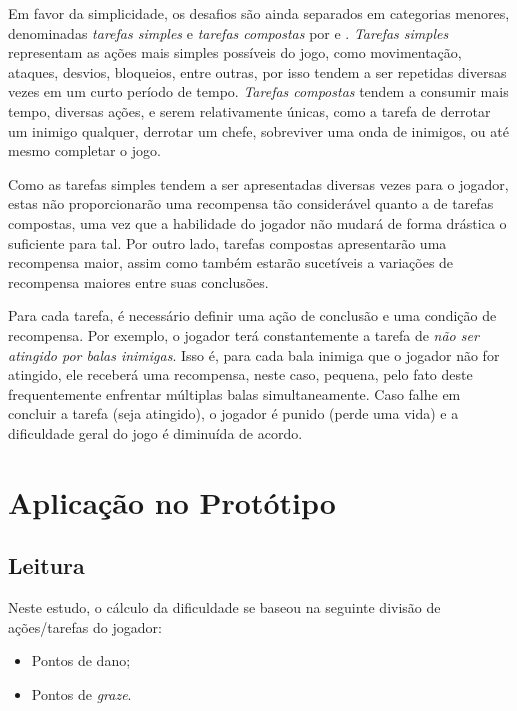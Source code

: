 Em favor da simplicidade, os desafios são ainda separados em categorias menores, denominadas \textit{tarefas simples} e \textit{tarefas compostas} por \citet{ExperimentalValidation} e \citet{FearOfFailing}. \textit{Tarefas simples} representam as ações mais simples possíveis do jogo, como movimentação, ataques, desvios, bloqueios, entre outras, por isso tendem a ser repetidas diversas vezes em um curto período de tempo. \textit{Tarefas compostas} tendem a consumir mais tempo, diversas ações, e serem relativamente únicas, como a tarefa de derrotar um inimigo qualquer, derrotar um chefe, sobreviver uma onda de inimigos, ou até mesmo completar o jogo.

Como as tarefas simples tendem a ser apresentadas diversas vezes para o jogador, estas não proporcionarão uma recompensa tão considerável quanto a de tarefas compostas, uma vez que a habilidade do jogador não mudará de forma drástica o suficiente para tal. Por outro lado, tarefas compostas apresentarão uma recompensa maior, assim como também estarão sucetíveis a variações de recompensa maiores entre suas conclusões.

Para cada tarefa, é necessário definir uma ação de conclusão e uma condição de recompensa. Por exemplo, o jogador terá constantemente a tarefa de \textit{não ser atingido por balas inimigas}. Isso é, para cada bala inimiga que o jogador não for atingido, ele receberá uma recompensa, neste caso, pequena, pelo fato deste frequentemente enfrentar múltiplas balas simultaneamente. Caso falhe em concluir a tarefa (seja atingido), o jogador é punido (perde uma vida) e a dificuldade geral do jogo é diminuída de acordo.

\section{Aplicação no Protótipo}

\subsection{Leitura}

Neste estudo, o cálculo da dificuldade se baseou na seguinte divisão de ações/tarefas do jogador:

\begin{itemize}
    \item Pontos de dano;
    \item Pontos de \textit{graze}.
\end{itemize}

